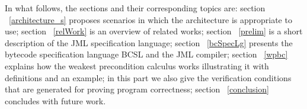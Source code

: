 In what follows, the sections and their corresponding topics are: 
section ~\ref{architecture_s} proposes scenarios in which the architecture is appropriate to use; section ~\ref{relWork} is an overview of related works; 
section  ~\ref{prelim} is a short description of the JML specification language; section ~\ref{bcSpecLg} presents the bytecode specification language BCSL and the JML compiler; section ~\ref{wpbc} explains how the weakest precondition calculus works illustrating it with definitions and an example; in this part we also give the verification conditions that are generated for proving program correctness; section ~\ref{conclusion} concludes with future work.  















